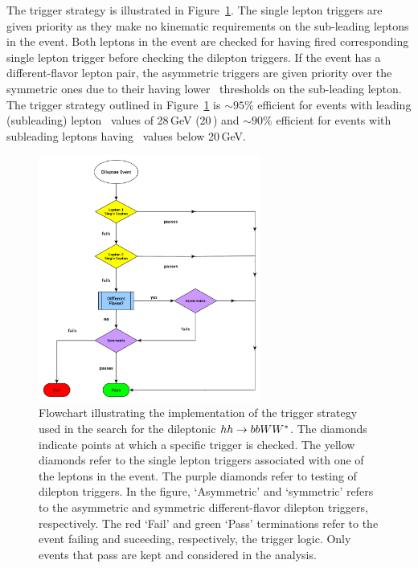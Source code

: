 The trigger strategy is illustrated in Figure~\ref{fig:hh_trig_flowchart}.
The single lepton triggers are given priority as they make no kinematic requirements on the
sub-leading leptons in the event.
Both leptons in the event are checked for having fired corresponding single lepton trigger before
checking the dilepton triggers.
If the event has a different-flavor lepton pair, the asymmetric triggers are given priority over the symmetric ones due to their having
lower \pT~thresholds on the sub-leading lepton.
The trigger strategy outlined in Figure~\ref{fig:hh_trig_flowchart} is $\sim 95\%$ efficient for events
with leading (subleading) lepton \pT~values of 28\,GeV (20\,\GeV) and $\sim 90\%$ efficient for events
with subleading leptons having \pT~values below 20\,GeV.

\begin{figure}[!htb]
    \begin{center}
        \includegraphics[width=0.65\textwidth]{figures/common_ana/trig/updated_trigger_logic_feb26PDF}
        \caption{
            Flowchart illustrating the implementation of the trigger strategy used in the
            search for the dileptonic $hh \rightarrow bbWW^*$.
            The diamonds indicate points at which a specific trigger is checked.
            The yellow diamonds refer to the single lepton triggers associated with one of the leptons in the event.
            The purple diamonds refer to testing of dilepton triggers.
            In the figure, `Asymmetric' and `symmetric' refers to the asymmetric and symmetric different-flavor
            dilepton triggers, respectively.
            The red `Fail' and green `Pass' terminations refer to the event failing and suceeding,
            respectively, the trigger logic.
            Only events that pass are kept and considered in the analysis.
        }
        \label{fig:hh_trig_flowchart}
    \end{center}
\end{figure}

